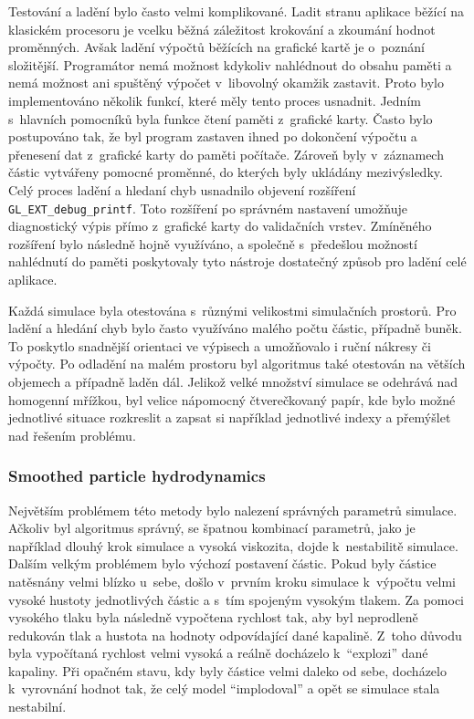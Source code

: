 Testování a ladění bylo často velmi komplikované. Ladit stranu aplikace běžící na klasickém procesoru je vcelku běžná záležitost krokování a zkoumání hodnot proměnných. Avšak ladění výpočtů běžících na grafické kartě je o~poznání složitější. Programátor nemá možnost kdykoliv nahlédnout do obsahu paměti a nemá možnost ani spuštěný výpočet v~libovolný okamžik zastavit. Proto bylo implementováno několik funkcí, které měly tento proces usnadnit. Jedním s~hlavních pomocníků byla funkce čtení paměti z~grafické karty. Často bylo postupováno tak, že byl program zastaven ihned po dokončení výpočtu a přenesení dat z~grafické karty do paměti počítače. Zároveň byly v~záznamech částic vytvářeny pomocné proměnné, do kterých byly ukládány mezivýsledky. Celý proces ladění a hledaní chyb usnadnilo objevení rozšíření \texttt{GL\_EXT\_debug\_printf}. Toto rozšíření po správném nastavení umožňuje diagnostický výpis přímo z~grafické karty do validačních vrstev. Zmíněného rozšíření bylo následně hojně využíváno, a společně s~předešlou možností nahlédnutí do paměti poskytovaly tyto nástroje dostatečný způsob pro ladění celé aplikace.

Každá simulace byla otestována s~různými velikostmi simulačních prostorů. Pro ladění a hledání chyb bylo často využíváno malého počtu částic, případně buněk. To poskytlo snadnější orientaci ve výpisech a umožňovalo i ruční nákresy či výpočty. Po odladění na malém prostoru byl algoritmus také otestován na větších objemech a případně laděn dál. Jelikož velké množství simulace se odehrává nad homogenní mřížkou, byl velice nápomocný čtverečkovaný papír, kde bylo možné jednotlivé situace rozkreslit a zapsat si například jednotlivé indexy a přemýšlet nad řešením problému.

\subsubsection{Smoothed particle hydrodynamics}
Největším problémem této metody bylo nalezení správných parametrů simulace. Ačkoliv byl algoritmus správný, se špatnou kombinací parametrů, jako je například dlouhý krok simulace a vysoká viskozita, dojde k~nestabilitě simulace. Dalším velkým problémem bylo výchozí postavení částic. Pokud byly částice natěsnány velmi blízko u~sebe, došlo v~prvním kroku simulace k~výpočtu velmi vysoké hustoty jednotlivých částic a s~tím spojeným vysokým tlakem. Za pomoci vysokého tlaku byla následně vypočtena rychlost tak, aby byl neprodleně redukován tlak a hustota na hodnoty odpovídající dané kapalině. Z~toho důvodu byla vypočítaná rychlost velmi vysoká a reálně docházelo k~\enquote{explozi} dané kapaliny. Při opačném stavu, kdy byly částice velmi daleko od sebe, docházelo k~vyrovnání hodnot tak, že celý model \enquote{implodoval} a opět se simulace stala nestabilní.


